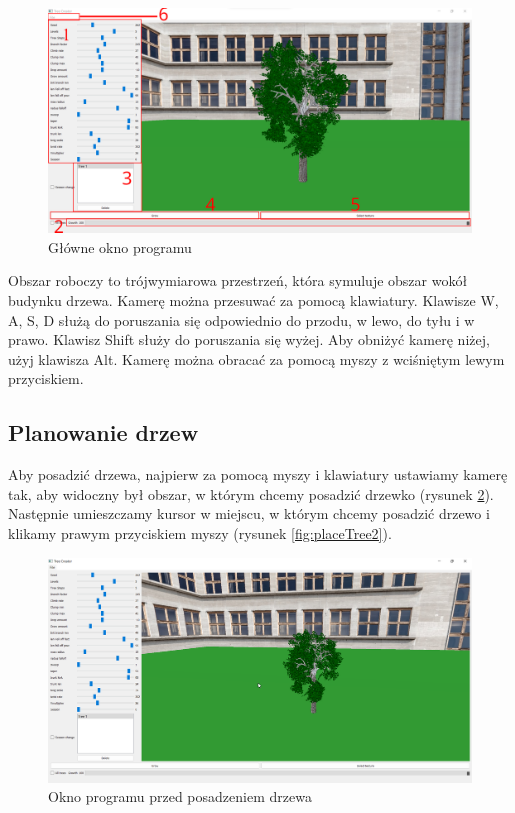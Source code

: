 \documentclass[a4paper,12pt,twoside]{book} %
\begin{document}
\begin{figure}[H]
	\centering\includegraphics[width=15.5cm]{grafika/program/main2.png}
	\caption{Główne okno programu}
    \label{fig:screenmainwindow}
\end{figure}

Obszar roboczy to trójwymiarowa przestrzeń, która symuluje obszar 
wokół budynku drzewa. Kamerę można przesuwać za pomocą klawiatury. 
Klawisze W, A, S, D służą do poruszania się odpowiednio do przodu, 
w lewo, do tyłu i w prawo. Klawisz Shift służy do poruszania się wyżej. 
Aby obniżyć kamerę niżej, użyj klawisza Alt. 
Kamerę można obracać za pomocą myszy z wciśniętym lewym przyciskiem.  


\subsection{Planowanie drzew}

Aby posadzić drzewa, najpierw za pomocą myszy i klawiatury 
ustawiamy kamerę tak, aby widoczny był obszar, w którym chcemy 
posadzić drzewko (rysunek \ref{fig:placeTree}). Następnie umieszczamy kursor w miejscu, w którym 
chcemy posadzić drzewo i klikamy prawym przyciskiem myszy (rysunek \ref{fig:placeTree2}).


\begin{figure}[H]
	\centering\includegraphics[width=15.5cm]{grafika/program/placeTree.png}
	\caption{Okno programu przed posadzeniem drzewa}
    \label{fig:placeTree}
\end{figure}
\end{document}

